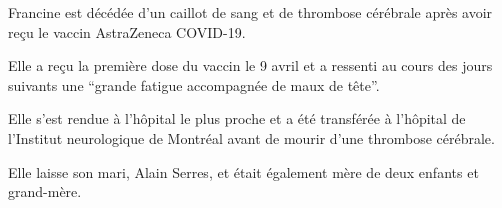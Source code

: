 Francine est décédée d'un caillot de sang et de thrombose cérébrale après avoir
reçu le vaccin AstraZeneca COVID-19.

Elle a reçu la première dose du vaccin le 9 avril et a ressenti au cours des
jours suivants une “grande fatigue accompagnée de maux de tête”.

Elle s'est rendue à l'hôpital le plus proche et a été transférée à l'hôpital de
l'Institut neurologique de Montréal avant de mourir d'une thrombose cérébrale.

Elle laisse son mari, Alain Serres, et était également mère de deux enfants et
grand-mère.

